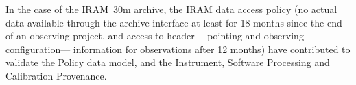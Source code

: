		In the case of the IRAM~30m archive, the IRAM data access
		policy (no actual data available through the archive
		interface at least for 18 months since the end of an
		observing project, and access to header ---pointing and
		observing configuration--- information for observations
		after 12 months) have contributed to validate the Policy
		data model, and the Instrument, Software Processing and
		Calibration Provenance.
		


